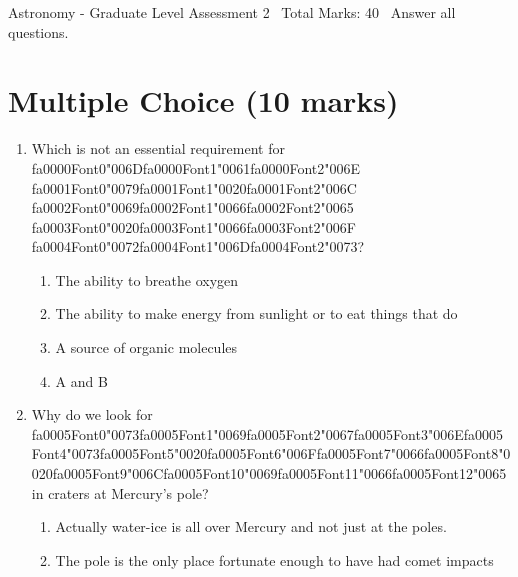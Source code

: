 \documentclass[12pt]{article}
\begin{document}
\begin{center}
Astronomy - Graduate Level Assessment 2 \
Total Marks: 40 \
Answer all questions.
\end{center}

\section*{Multiple Choice (10 marks)}
\begin{enumerate}[label=\arabic*.]
\item Which is not an essential requirement for {\csname fa0000Font0\endcsname\char"006D}{\csname fa0000Font1\endcsname\char"0061}{\csname fa0000Font2\endcsname\char"006E} {\csname fa0001Font0\endcsname\char"0079}{\csname fa0001Font1\endcsname\char"0020}{\csname fa0001Font2\endcsname\char"006C} {\csname fa0002Font0\endcsname\char"0069}{\csname fa0002Font1\endcsname\char"0066}{\csname fa0002Font2\endcsname\char"0065} {\csname fa0003Font0\endcsname\char"0020}{\csname fa0003Font1\endcsname\char"0066}{\csname fa0003Font2\endcsname\char"006F} {\csname fa0004Font0\endcsname\char"0072}{\csname fa0004Font1\endcsname\char"006D}{\csname fa0004Font2\endcsname\char"0073}?
\begin{enumerate}[label=(\alph*)]
    \item The ability to breathe oxygen
    \item The ability to make energy from sunlight or to eat things that do
    \item A source of organic molecules
    \item A and B
\end{enumerate}
\item Why do we look for {\csname fa0005Font0\endcsname\char"0073}{\csname fa0005Font1\endcsname\char"0069}{\csname fa0005Font2\endcsname\char"0067}{\csname fa0005Font3\endcsname\char"006E}{\csname fa0005Font4\endcsname\char"0073}{\csname fa0005Font5\endcsname\char"0020}{\csname fa0005Font6\endcsname\char"006F}{\csname fa0005Font7\endcsname\char"0066}{\csname fa0005Font8\endcsname\char"0020}{\csname fa0005Font9\endcsname\char"006C}{\csname fa0005Font10\endcsname\char"0069}{\csname fa0005Font11\endcsname\char"0066}{\csname fa0005Font12\endcsname\char"0065} in craters at Mercury's pole?
\begin{enumerate}[label=(\alph*)]
    \item Actually water-ice is all over Mercury and not just at the poles.
    \item The pole is the only place fortunate enough to have had comet impacts

\end{enumerate}
\end{enumerate}
\end{document}
